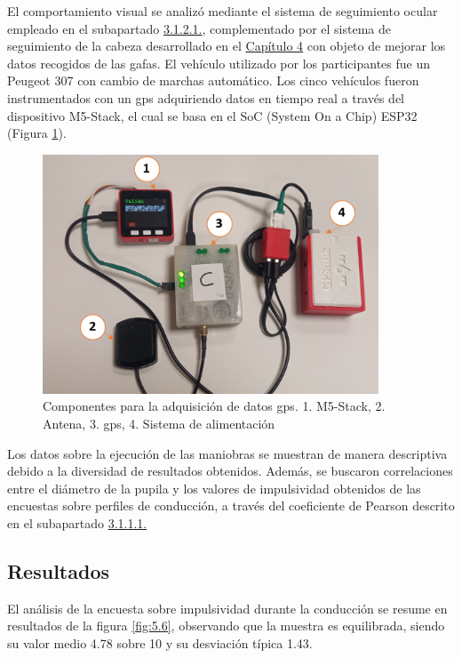 El comportamiento visual se analizó mediante el sistema de seguimiento ocular empleado en el subapartado \hyperref[3121]{3.1.2.1.}, complementado por el sistema de seguimiento de la cabeza desarrollado en el \hyperref[ch4]{Capítulo 4} con objeto de mejorar los datos recogidos de las gafas. El vehículo utilizado por los participantes fue un Peugeot 307 con cambio de marchas automático. Los cinco vehículos fueron instrumentados con un \gls{gps} adquiriendo datos en tiempo real a través del dispositivo M5-Stack, el cual se basa en el SoC (System On a Chip) ESP32 (Figura \ref{fig:5.5}).

\begin{figure}[h]
    \centering
    \includegraphics[width=10cm]
    {figures/5.5.png}
    \caption{ \label{fig:5.5} Componentes para la adquisición de datos \gls{gps}. 1. M5-Stack, 2. Antena, 3. \gls{gps}, 4. Sistema de alimentación}
\end{figure}

Los datos sobre la ejecución de las maniobras se muestran de manera descriptiva debido a la diversidad de resultados obtenidos. Además, se buscaron correlaciones entre el diámetro de la pupila y los valores de impulsividad obtenidos de las encuestas sobre perfiles de conducción, a través del coeficiente de Pearson descrito en el subapartado \hyperref[3111]{3.1.1.1.}

\subsection{Resultados} 
El análisis de la encuesta sobre impulsividad durante la conducción se resume en resultados de la figura \ref{fig:5.6}, observando que la muestra es equilibrada, siendo su valor medio 4.78 sobre 10 y su desviación típica 1.43. 

